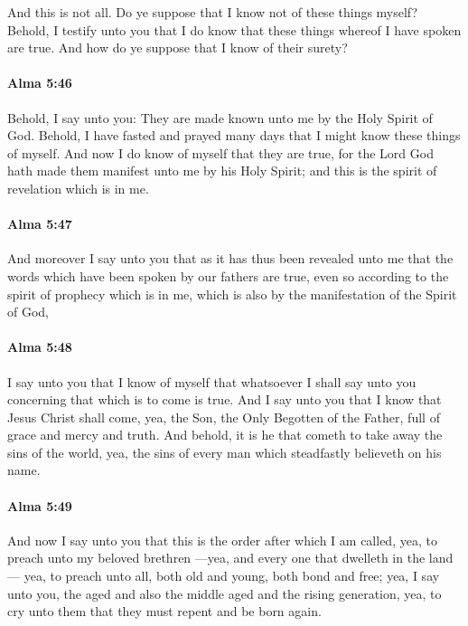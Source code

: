 			And this is not all.
			Do ye suppose that I know not of these things myself?
			Behold, I testify unto you
			that I do know that these things whereof I have spoken are true.
			And how do ye suppose that I know of their surety?

		\paragraph{Alma 5:46} %
			\label{ALMA-5-46}

			Behold, I say unto you:
			They are made known unto me by the Holy Spirit of God.
			Behold, I have fasted and prayed many days
			that I might know these things of myself.
			And now I do know of myself that they are true,
			for the Lord God hath made them manifest unto me by his Holy Spirit;
			and this is the spirit of revelation which is in me.

		\paragraph{Alma 5:47} %
			\label{ALMA-5-47}

			And moreover I say unto you that
			as it has thus been revealed unto me
			that the words which have been spoken by our fathers are true,
			even so according to the spirit of prophecy which is in me,
			which is also by the manifestation of the Spirit of God,

		\paragraph{Alma 5:48} %
			\label{ALMA-5-48}

			I say unto you that I know of myself
			that whatsoever I shall say unto you concerning that which is to come is true.
			And I say unto you
			that I know that Jesus Christ shall come,
			yea, the Son, the Only Begotten of the Father,
			full of grace and mercy and truth.
			And behold, it is he that cometh to take away the sins of the world,
			yea, the sins of every man which steadfastly believeth on his name.

		\paragraph{Alma 5:49} %
			\label{ALMA-5-49}

			And now I say unto you
			that this is the order after which I am called,
			yea, to preach unto my beloved brethren
			---yea, and every one that dwelleth in the land---
			yea, to preach unto all,
			both old and young, both bond and free;
			yea, I say unto you,
			the aged and also the middle aged and the rising generation,
			yea, to cry unto them
			that they must repent and be born again.

